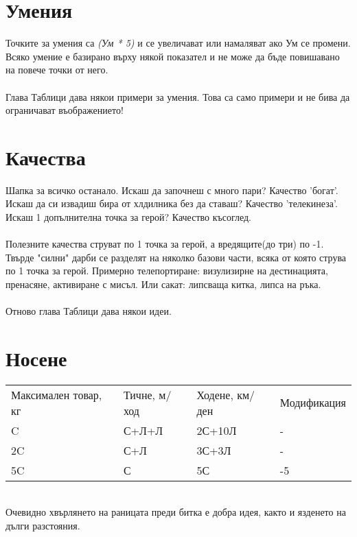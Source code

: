 \section{Умения}
Точките за умения са \textit{(Ум * 5)} и се увеличават или намаляват ако Ум се промени.
Всяко умение е базирано върху някой показател и не може да бъде повишавано на повече точки от него.
\\
\\
Глава Таблици дава някои примери за умения.
Това са само примери и не бива да ограничават въображението!


\section{Качества}
Шапка за всичко останало.
Искаш да започнеш с много пари? Качество 'богат'.
Искаш да си извадиш бира от хлдилника без да ставаш? Качество 'телекинеза'.
Искаш 1 допълнителна точка за герой? Качество късоглед.
\\
\\
Полезните качества струват по 1 точка за герой, а вредящите(до три) по -1.
Твърде "силни" дарби се разделят на няколко базови части, всяка от която струва по 1 точка за герой.
Примерно телепортиране: визулизирне на дестинацията, пренасяне, активиране с мисъл.
Или сакат: липсваща китка, липса на ръка.
\\
\\
Отново глава Таблици дава някои идеи.


\section{Носене}
\begin{tabular}{p{1.4cm} | p{1.4cm} | p{1.4cm} | p{1.4cm}}
Максимален товар, кг & Тичне, м/ход & Ходене, км/ден & Модификация  \\
C                    & С+Л+Л        & 2С+10Л         & -            \\
2C                   & С+Л          & 3С+3Л          & -            \\
5C                   & С            & 5С             & -5
\end{tabular}
\\
Очевидно хвърлянето на раницата преди битка е добра идея, както и язденето на дълги разстояния.



